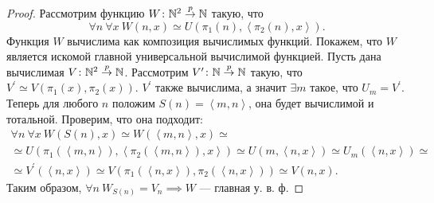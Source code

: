 \begin{proof}
    Рассмотрим функцию $W \colon \mathbb{N}^{2} \overset{p}{\to} \mathbb{N}$ такую, что 
    $$
        \forall n ~ \forall x ~ W(n, x) \simeq U(\pi_{1}(n), \left<\pi_{2}(n), x\right>).
    $$
    Функция $W$ вычислима как композиция вычислимых функций.
    Покажем, что $W$ является искомой главной универсальной вычислимой функцией.
    Пусть дана вычислимая $V \colon \mathbb{N}^{2} \overset{p}{\to} \mathbb{N}$.
    Рассмотрим $V^{\prime} \colon \mathbb{N} \overset{p}{\to} \mathbb{N}$ такую, что $V^{\prime} \simeq V(\pi_{1}(x), \pi_{2}(x))$.
    $V^{\prime}$ также вычислима, а значит $\exists m$ такое, что $U_{m} = V^{\prime}$.
    Теперь для любого $n$ положим $S(n) = \left< m, n \right>$, она будет вычислимой и тотальной.
    Проверим, что она подходит:
    \begin{multline}
        \forall n ~ \forall x ~ W(S(n), x) \simeq W(\left< m, n \right>, x) \simeq \\
        \simeq U(\pi_{1}(\left< m, n \right>), \left< \pi_{2}(\left< m, n \right>), x \right> ) \simeq U(m, \left< n, x\right> ) \simeq U_{m}(\left< n, x \right> ) \simeq \\
        \simeq V^{\prime}(\left< n, x\right>) \simeq V(\pi_{1}(\left< n, x \right>), \pi_{2}(\left< n, x \right>)) \simeq V(n, x).
    \end{multline}
    Таким образом, $\forall n ~ W_{S(n)} = V_{n} \implies W$ --- главная у. в. ф.
\end{proof}
